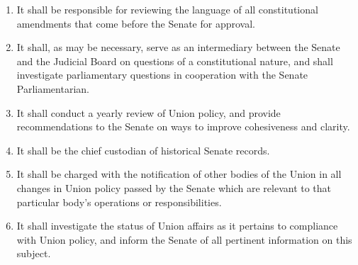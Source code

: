 \documentclass{uniondoc}
\begin{document}
\begin{enumerate}
\begin{enumerate}
		      \item It shall be responsible for reviewing the language of all constitutional amendments that come before the Senate for approval.
		      \item It shall, as may be necessary, serve as an intermediary between the Senate and the Judicial Board on questions of a constitutional nature,
		            and shall investigate parliamentary questions in cooperation with the Senate Parliamentarian.
		      \item It shall conduct a yearly review of Union policy,
		            and provide recommendations to the Senate on ways to improve cohesiveness and clarity.
		      \item It shall be the chief custodian of historical Senate records.
		      \item It shall be charged with the notification of other bodies of the Union in all changes in Union policy passed by the Senate which are relevant to that particular body’s operations or responsibilities.
		      \item It shall investigate the status of Union affairs as it pertains to compliance with Union policy,
		            and inform the Senate of all pertinent information on this subject.
	      \end{enumerate}
\end{enumerate}

\end{document}
